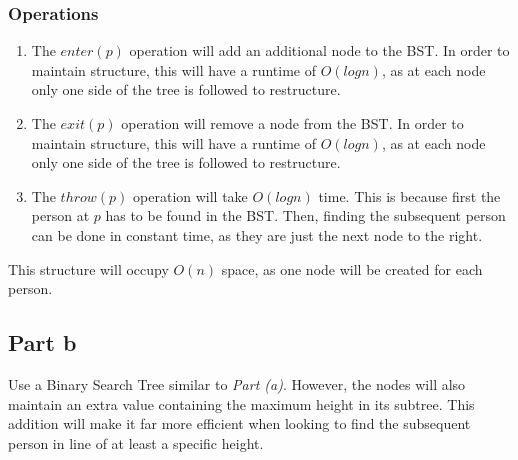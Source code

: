\documentclass{article}
\begin{document}
\subsubsection{Operations}
\begin{enumerate}
    \item The $enter(p)$ operation will add an additional node to the BST.
        In order to maintain structure, this will have a runtime of $O(log n)$,
        as at each node only one side of the tree is followed to restructure.
    \item The $exit(p)$ operation will remove a node from the BST.
        In order to maintain structure, this will have a runtime of $O(log n)$,
        as at each node only one side of the tree is followed to restructure.
    \item The $throw(p)$ operation will take $O(log n)$ time.
        This is because first the person at $p$ has to be found in the BST.
        Then, finding the subsequent person can be done in constant time,
        as they are just the next node to the right.
\end{enumerate}

This structure will occupy $O(n)$ space, as one node will be created for each person.

\subsection{Part b}

Use a Binary Search Tree similar to \emph{Part (a)}.
However, the nodes will also maintain an extra value containing the maximum height in its subtree.
This addition will make it far more efficient when looking to find the subsequent person in line of at least a specific height.
\end{document}
